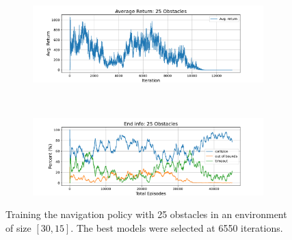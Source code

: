 \begin{figure}
    \centering
    \begin{subfigure}[b]{\textwidth}
        \centering
        \captionsetup{justification=centering}
        \includegraphics[width=0.98\textwidth]{figures/7_/3DCarModel_BodyObs_NavSetup_25_NewObs_EnvSpace15_last7600_v1_again_reward.pdf}
        \label{fig:25_obst_nav_rew}
    \end{subfigure} \\
    \begin{subfigure}[b]{\textwidth}
        \centering
        \captionsetup{justification=centering}
        \includegraphics[width=0.98\textwidth]{figures/7_/3DCarModel_BodyObs_NavSetup_25_NewObs_EnvSpace15_last7600_v1_again_end_info.pdf}
        \label{fig:25_obst_nav_end}
    \end{subfigure} 
    \caption{Training the navigation policy with 25 obstacles in an environment of size $[30, 15]$. The best models were selected at 6550 iterations.}
    \label{fig:7_train_nav_25_obst}
\end{figure}